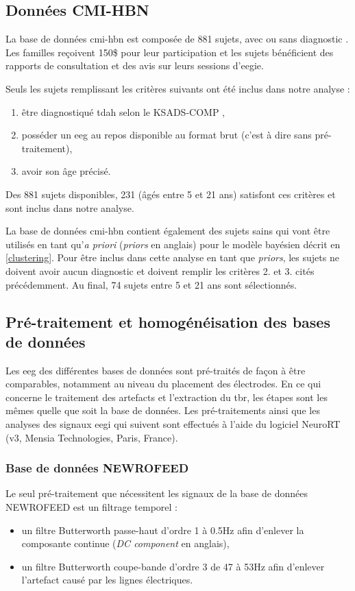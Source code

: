 \subsection{Données CMI-HBN}
La base de données \gls{cmi-hbn} est composée de 881 sujets, avec ou sans diagnostic \citep{Alexander2017, Alexander2017b}. Les familles reçoivent 150\$ pour leur participation 
et les sujets bénéficient des rapports de consultation et des avis sur leurs sessions d'\gls{eegie}.

Seuls les sujets remplissant les critères suivants ont été inclus dans notre analyse :
\begin{enumerate}
\item être diagnostiqué \gls{tdah} selon le KSADS-COMP \citep{Kaufman1997},
\item posséder un \gls{eeg} au repos disponible au format brut (c'est à dire sans pré-traitement),
\item avoir son âge précisé.
\end{enumerate}

Des 881 sujets disponibles, 231 (âgés entre 5 et 21 ans) satisfont ces critères et sont inclus dans notre analyse.

La base de données \gls{cmi-hbn} contient également des sujets sains qui vont être utilisés en tant qu'\textit{a priori} (\textit{priors} en anglais) pour le
modèle bayésien décrit en \ref{clustering}. Pour être inclus dans cette analyse en tant que \textit{priors}, les sujets ne doivent avoir aucun diagnostic 
et doivent remplir les critères 2. et 3. cités précédemment. Au final, 74 sujets entre 5 et 21 ans sont sélectionnés. 

\subsection{Pré-traitement et homogénéisation des bases de données} \label{pré-traitement TBR}
Les \gls{eeg} des différentes bases de données sont pré-traités de façon à être comparables, notamment au niveau du placement des électrodes.
En ce qui concerne le traitement des artefacts et l'extraction du \gls{tbr}, les étapes sont les mêmes quelle que soit la base de données. 
Les pré-traitements ainsi que les analyses des signaux \gls{eegi} qui suivent sont effectués à l'aide du logiciel NeuroRT (v3, Mensia Technologies, 
Paris, France).

\subsubsection{Base de données NEWROFEED}
Le seul pré-traitement que nécessitent les signaux de la base de données NEWROFEED est un filtrage temporel : 
\begin{itemize}
\item un filtre Butterworth passe-haut d'ordre 1 à 0.5Hz afin d'enlever la composante continue (\textit{DC component} en anglais),
\item un filtre Butterworth coupe-bande d'ordre 3 de 47 à 53Hz afin d'enlever l'artefact causé par les lignes électriques.
\end{itemize}

